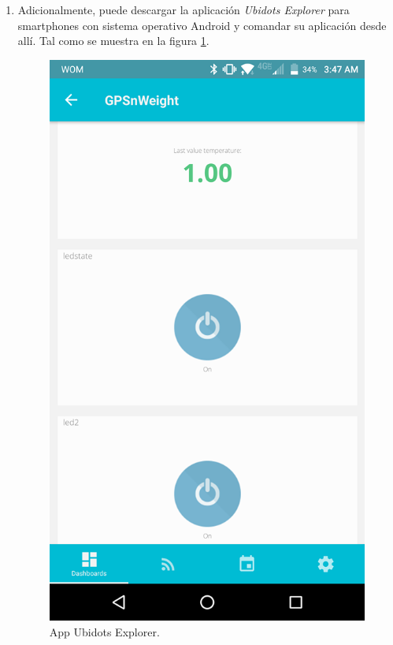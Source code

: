 \documentclass[letterpaper, 10pt]{report}
\begin{document}
\begin{enumerate}
\item Adicionalmente, puede descargar la aplicación \emph{Ubidots Explorer} para smartphones con sistema operativo Android y comandar su aplicación desde allí. Tal como se muestra en la figura \ref{android}.
\begin{figure}[h!]
	\centering
	\includegraphics[scale=0.2]{android.png}
	\caption{App Ubidots Explorer. \label{android}}
\end{figure}

\end{enumerate}
\end{document}
